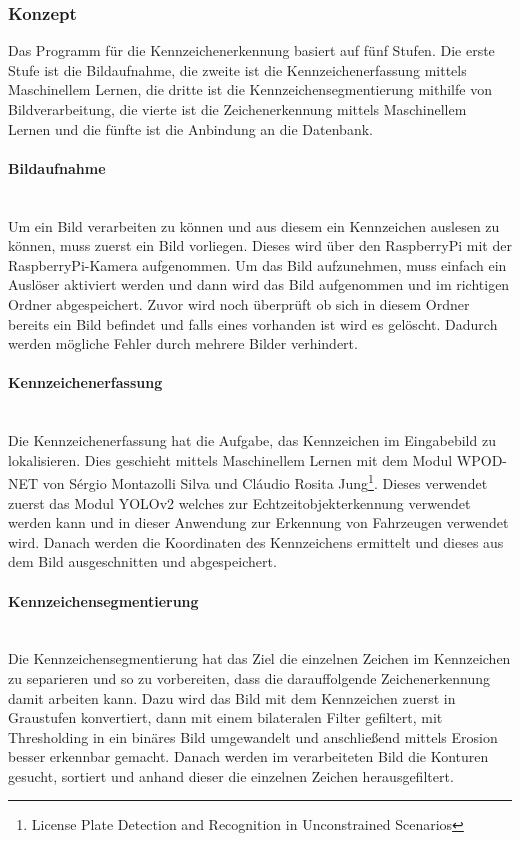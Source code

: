 \subsubsection{Konzept}
Das Programm für die Kennzeichenerkennung basiert auf fünf Stufen. Die erste Stufe ist die Bildaufnahme, die zweite ist die 
Kennzeichenerfassung mittels Maschinellem Lernen, die dritte ist die Kennzeichensegmentierung mithilfe von Bildverarbeitung, 
die vierte ist die Zeichenerkennung mittels Maschinellem Lernen und die fünfte ist die Anbindung an die Datenbank.

\paragraph{Bildaufnahme}\mbox{}\\
Um ein Bild verarbeiten zu können und aus diesem ein Kennzeichen auslesen zu können, muss zuerst ein Bild vorliegen. 
Dieses wird über den RaspberryPi mit der RaspberryPi-Kamera aufgenommen. Um das Bild aufzunehmen, muss einfach ein Auslöser 
aktiviert werden und dann wird das Bild aufgenommen und im richtigen Ordner abgespeichert. Zuvor wird noch überprüft ob 
sich in diesem Ordner bereits ein Bild befindet und falls eines vorhanden ist wird es gelöscht. Dadurch werden mögliche Fehler 
durch mehrere Bilder verhindert.

\paragraph{Kennzeichenerfassung}\mbox{}\\
Die Kennzeichenerfassung hat die Aufgabe, das Kennzeichen im Eingabebild zu lokalisieren. Dies geschieht mittels Maschinellem Lernen 
mit dem Modul WPOD-NET von Sérgio Montazolli Silva und Cláudio Rosita Jung\footnote{License Plate Detection and Recognition in Unconstrained Scenarios}. Dieses verwendet zuerst das Modul YOLOv2 welches zur 
Echtzeitobjekterkennung verwendet werden kann und in dieser Anwendung zur Erkennung von Fahrzeugen verwendet wird. Danach werden 
die Koordinaten des Kennzeichens ermittelt und dieses aus dem Bild ausgeschnitten und abgespeichert.

\paragraph{Kennzeichensegmentierung}\mbox{}\\
Die Kennzeichensegmentierung hat das Ziel die einzelnen Zeichen im Kennzeichen zu separieren und so zu vorbereiten, dass die 
darauffolgende Zeichenerkennung damit arbeiten kann. Dazu wird das Bild mit dem Kennzeichen zuerst in Graustufen konvertiert, 
dann mit einem bilateralen Filter gefiltert, mit Thresholding in ein binäres Bild umgewandelt und anschließend mittels Erosion 
besser erkennbar gemacht. Danach werden im verarbeiteten Bild die Konturen gesucht, sortiert und anhand dieser die einzelnen Zeichen herausgefiltert.

